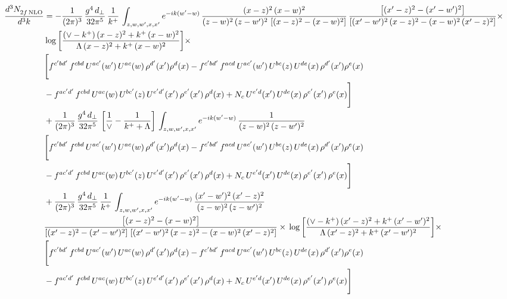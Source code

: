 \documentclass[9pt]{article}
\numberwithin{equation}{section}
\begin{document}
\begin{align}
    \frac{d^{3}N_{2f\,\rm NLO}^{\rm}}{d^{3}k}  & =  - \frac{1}{(2\pi)^{3}}\, \frac{g^{4}\,d_{\perp}}{32\pi^{5}}\,\frac{1}{k^{+}}\,\int_{z,w,w^{\prime},x,x'} e^{-ik(w^{\prime}-w)}\,\frac{(x-z)^{2}\, (x-w)^{2}}{(z-w)^{2}\, (z-w')^{2}\,\left[(x-z)^{2} - (x-w)^{2}\right]}\,\frac{\left[(x'-z)^{2}-(x'-w')^{2}\right]}{\left[(x'-w')^{2}\, (x-z)^{2} - (x-w)^{2}\, (x'-z)^{2}\right]}\times\notag \\ & \log{\left[\frac{(\vee - k^{+})\, (x-z)^{2} + k^{+}\, (x-w)^{2}}{\Lambda\, (x-z)^{2} + k^{+}\, (x-w)^{2}}\right]}\times\notag \\ & \Bigg[f^{c'bd'}\,f^{cbd}\, U^{ac'}(w')\,U^{ac}(w)\,\rho^{d'}(x')\rho^{d}(x)- f^{c'bd'}\,f^{acd}\,U^{ac'}(w')\,U^{bc}(z)\,U^{de}(x)\,\rho^{d'}(x')\rho^{e}(x) \notag \\ & -f^{ac'd'}\,f^{cbd}\,U^{ac}(w)\,U^{bc'}(z)\,U^{e'd'}(x')\,\rho^{e'}(x')\,\rho^{d}(x) +N_{c}\,U^{e'd}(x')\,U^{de}(x)\,\rho^{e'}(x')\,\rho^{e}(x)\Bigg] \notag \\ & + \frac{1}{(2\pi)^{3}}\, \frac{g^{4}\,d_{\perp}}{32\pi^{5}}\,\left[\frac{1}{\vee} - \frac{1}{k^{+} + \Lambda}\right]\,\int_{z,w,w^{\prime},x,x'} e^{-ik(w^{\prime}-w)}\,\frac{1}{(z-w)^{2}\, (z-w')^{2}}\notag \\ & \Bigg[f^{c'bd'}\,f^{cbd}\, U^{ac'}(w')\,U^{ac}(w)\,\rho^{d'}(x')\rho^{d}(x)- f^{c'bd'}\,f^{acd}\,U^{ac'}(w')\,U^{bc}(z)\,U^{de}(x)\,\rho^{d'}(x')\rho^{e}(x) \notag \\ & -f^{ac'd'}\,f^{cbd}\,U^{ac}(w)\,U^{bc'}(z)\,U^{e'd'}(x')\,\rho^{e'}(x')\,\rho^{d}(x) +N_{c}\,U^{e'd}(x')\,U^{de}(x)\,\rho^{e'}(x')\,\rho^{e}(x)\Bigg] \notag \\ & + \frac{1}{(2\pi)^{3}}\, \frac{g^{4}\,d_{\perp}}{32\pi^{5}}\,\frac{1}{k^{+}}\,\int_{z,w,w^{\prime},x,x'} e^{-ik(w^{\prime}-w)}\,\frac{(x'-w')^{2}\, (x'-z)^{2}}{(z-w)^{2}\, (z-w')^{2}}\notag \\ & \frac{\left[(x-z)^{2} - (x-w)^{2}\right]}{\left[(x'-z)^{2} - (x'-w')^{2}\right]\, \left[(x'-w')^{2}\, (x - z)^{2} - (x-w)^{2}\,(x'-z)^{2}\right]}\times\, \log{\left[\frac{(\vee - k^{+})\, (x'-z)^{2} + k^{+}\, (x'-w')^{2}}{\Lambda\, (x'-z)^{2} + k^{+}\, (x'-w')^{2}}\right]}\times \notag \\ &  \Bigg[f^{c'bd'}\,f^{cbd}\, U^{ac'}(w')\,U^{ac}(w)\,\rho^{d'}(x')\rho^{d}(x)- f^{c'bd'}\,f^{acd}\,U^{ac'}(w')\,U^{bc}(z)\,U^{de}(x)\,\rho^{d'}(x')\rho^{e}(x) \notag \\ & -f^{ac'd'}\,f^{cbd}\,U^{ac}(w)\,U^{bc'}(z)\,U^{e'd'}(x')\,\rho^{e'}(x')\,\rho^{d}(x) +N_{c}\,U^{e'd}(x')\,U^{de}(x)\,\rho^{e'}(x')\,\rho^{e}(x)\Bigg]
\end{align}
\end{document}
